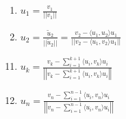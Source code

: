 \documentclass[12pt]{article}
\theoremstyle{definition}
\begin{document}
\begin{enumerate}[label = (\arabic*)]
\item $\displaystyle u_1 = \frac{v_1}{||v_1||}$

\item $\displaystyle u_2 = \frac{\widetilde{u}_2}{||\widetilde{u}_2||} =
\frac{v_2 - \langle u_1, u_2 \rangle u_1}{||v_2 - \langle u_1, v_2 \rangle u_1 ||}$

\end{enumerate}

\begin{enumerate}[label = (\alph*)]
\setcounter{enumi}{10}
\item $\displaystyle u_k = \frac{\displaystyle v_k - \sum^{k+1}_{i = 1} \langle u_i, v_k \rangle u_i}
{\displaystyle \left|\left| v_k - \sum^{k+1}_{i = 1} \langle u_i, v_k \rangle u_i \right|\right|}$


\setcounter{enumi}{13}
\item $\displaystyle u_n = \frac{\displaystyle v_n - \sum^{n-1}_{i = 1} \langle u_i, v_n \rangle u_i}
{\displaystyle \left|\left| v_n - \sum^{n-1}_{i = 1} \langle u_i, v_n \rangle u_i \right|\right|}$
\end{enumerate}
\end{document}
